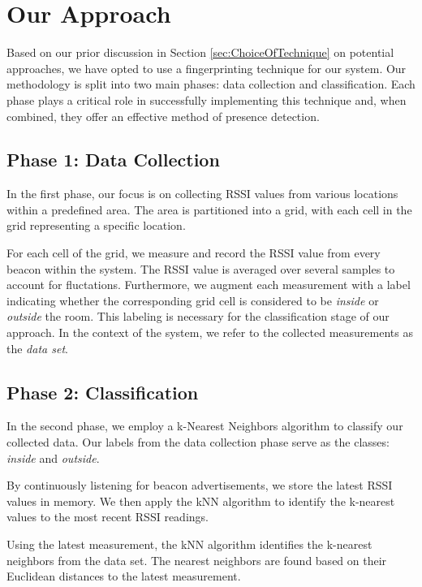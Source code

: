 \section{Our Approach}\label{sec:our_approach}
Based on our prior discussion in Section \ref{sec:ChoiceOfTechnique} on potential approaches, we have opted to use a fingerprinting technique for our system.
Our methodology is split into two main phases: data collection and classification.
Each phase plays a critical role in successfully implementing this technique and, when combined, they offer an effective method of presence detection.

\subsection{Phase 1: Data Collection}\label{sec:phase1_data_collection}
In the first phase, our focus is on collecting RSSI values from various locations within a predefined area. The area is partitioned into a grid, with each cell in the grid representing a specific location. 

For each cell of the grid, we measure and record the RSSI value from every beacon within the system.
The RSSI value is averaged over several samples to account for fluctations.
Furthermore, we augment each measurement with a label indicating whether the corresponding grid cell is considered to be \textit{inside} or \textit{outside} the room.
This labeling is necessary for the classification stage of our approach.
In the context of the system, we refer to the collected measurements as the \textit{data set}.

\subsection{Phase 2: Classification}\label{sec:phase2_classification}
In the second phase, we employ a k-Nearest Neighbors algorithm to classify our collected data. Our labels from the data collection phase serve as the classes: \textit{inside} and \textit{outside}.

By continuously listening for beacon advertisements, we store the latest RSSI values in memory. 
We then apply the kNN algorithm to identify the k-nearest values to the most recent RSSI readings.

Using the latest measurement, the kNN algorithm identifies the k-nearest neighbors from the data set. 
The nearest neighbors are found based on their Euclidean distances to the latest measurement.

